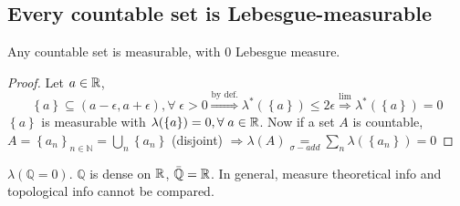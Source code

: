 \subsection{Every countable set is Lebesgue-measurable}
\begin{proposition}
    Any countable set is measurable, with \(0\) Lebesgue measure.
\end{proposition}
\begin{proof}
    Let \(a \in \mathbb{R}\), \[\left\lbrace a \right\rbrace \subseteq (a-\epsilon, a+\epsilon), \forall \; \epsilon > 0 \overset{\text{by def.}}{\Rightarrow} \lambda^*(\left\lbrace a \right\rbrace) \leq 2\epsilon \overset{\mbox{lim}}{\Rightarrow} \lambda^*(\left\lbrace a \right\rbrace) = 0\]
    \(\left\lbrace a \right\rbrace\) is measurable with \(\lambda(\left\lbrace a \right\rbrace) = 0, \forall \; a \in \mathbb{R}\). Now if a set \(A\) is countable, \(A = \left\lbrace a_n \right\rbrace_{n \in \mathbb{N}} = \bigcup_n \left\lbrace a_n \right\rbrace\) (disjoint) \(\Rightarrow \lambda(A) \underset{\sigma-add}{=} \sum_n \lambda(\left\lbrace a_n \right\rbrace) = 0\)
\end{proof}
\begin{remark}
    \(\lambda(\mathbb{Q} = 0)\). \(\mathbb{Q}\) is dense on \(\mathbb{R}\), \(\bar{\mathbb{Q}} = \mathbb{R}\). In general, measure theoretical info and topological info cannot be compared.
\end{remark}
